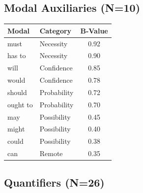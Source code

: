 \documentclass[11pt,a4paper]{article}
\begin{document}
\subsection{Modal Auxiliaries (N=10)}

\begin{center}
\begin{tabular}{llc}
\toprule
\textbf{Modal} & \textbf{Category} & \textbf{B-Value} \\
\midrule
must & Necessity & 0.92 \\
has to & Necessity & 0.90 \\
will & Confidence & 0.85 \\
would & Confidence & 0.78 \\
should & Probability & 0.72 \\
ought to & Probability & 0.70 \\
may & Possibility & 0.45 \\
might & Possibility & 0.40 \\
could & Possibility & 0.38 \\
can & Remote & 0.35 \\
\bottomrule
\end{tabular}
\end{center}

\subsection{Quantifiers (N=26)}
\end{document}
